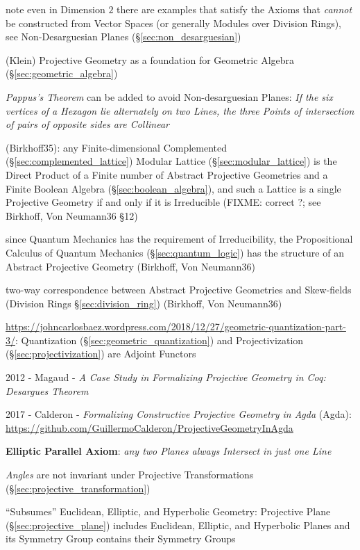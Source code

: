 note even in Dimension $2$ there are examples that satisfy the Axioms that
\emph{cannot} be constructed from Vector Spaces (or generally Modules over
Division Rings), see Non-Desarguesian Planes (\S\ref{sec:non_desarguesian})

\fist (Klein) Projective Geometry as a foundation for Geometric Algebra
(\S\ref{sec:geometric_algebra})

\emph{Pappus's Theorem} can be added to avoid Non-desarguesian Planes:
\emph{If the six vertices of a Hexagon lie alternately on two Lines, the three
Points of intersection of pairs of opposite sides are Collinear}

(Birkhoff35): any Finite-dimensional Complemented
(\S\ref{sec:complemented_lattice}) Modular Lattice (\S\ref{sec:modular_lattice})
is the Direct Product of a Finite number of Abstract Projective Geometries and a
Finite Boolean Algebra (\S\ref{sec:boolean_algebra}), and such a
Lattice is a single Projective Geometry if and only if it is Irreducible
(FIXME: correct ?; see Birkhoff, Von Neumann36 \S 12)

since Quantum Mechanics has the requirement of Irreducibility, the Propositional
Calculus of Quantum Mechanics (\S\ref{sec:quantum_logic}) has the structure of
an Abstract Projective Geometry (Birkhoff, Von Neumann36)

two-way correspondence between Abstract Projective Geometries and Skew-fields
(Division Rings \S\ref{sec:division_ring}) (Birkhoff, Von Neumann36)

\url{https://johncarlosbaez.wordpress.com/2018/12/27/geometric-quantization-part-3/}:
Quantization (\S\ref{sec:geometric_quantization}) and Projectivization
(\S\ref{sec:projectivization}) are Adjoint Functors

2012 - Magaud - \emph{A Case Study in Formalizing Projective Geometry in Coq:
Desargues Theorem}

2017 - Calderon - \emph{Formalizing Constructive Projective Geometry in Agda}
(Agda): \url{https://github.com/GuillermoCalderon/ProjectiveGeometryInAgda}

\textbf{Elliptic Parallel Axiom}: \emph{any two Planes always Intersect in just
  one Line}

\emph{Angles} are not invariant under Projective Transformations
(\S\ref{sec:projective_transformation})

``Subsumes'' Euclidean, Elliptic, and Hyperbolic Geometry: Projective
Plane (\S\ref{sec:projective_plane}) includes Euclidean, Elliptic, and
Hyperbolic Planes and its Symmetry Group contains their Symmetry
Groups


